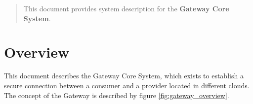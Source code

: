 \documentclass[a4paper]{arrowhead}
\begin{document}
\ArrowheadDate{\today}
\ArrowheadSetup

\begin{center}
  \vspace*{1cm}
  \huge{\arrowtitle}

  \vspace*{0.2cm}
  \LARGE{\arrowtype}
  \vspace*{1cm}

  \vspace*{\fill}


  \vspace*{1cm}
  \vspace*{\fill}

  \begin{abstract}
    This document provides system description for the \textbf{Gateway Core System}.
  \end{abstract}

  \vspace*{1cm}

 \end{center}

\newpage

\tableofcontents
\newpage

\section{Overview}
\label{sec:overview}
\color{black}
This document describes the Gateway Core System, which exists to establish a secure connection between a consumer and a provider located in different clouds. The concept of the Gateway is described by figure \ref{fig:gateway_overview}. 
\end{document}
